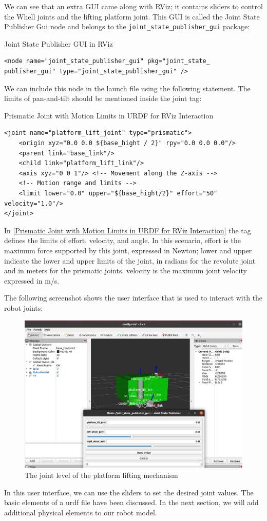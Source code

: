 \documentclass[../../main]{subfiles}
\begin{document}
We can see that an extra GUI came along with RViz; it contains sliders to control the
Whell joints and the lifting platform joint. This GUI is called the Joint State Publisher Gui node and
belongs to the \texttt{joint\_state\_publisher\_gui} package:
\begin{codebox}[]{Joint State Publisher GUI in RViz}
  \begin{verbatim}
<node name="joint_state_publisher_gui" pkg="joint_state_
publisher_gui" type="joint_state_publisher_gui" />
\end{verbatim}
  \end{codebox}

We can include this node in the launch file using the following statement. The limits of
pan-and-tilt should be mentioned inside the joint tag:

\begin{codebox}[label=Prismatic Joint with Motion Limits in URDF for RViz Interaction]{Prismatic Joint with Motion Limits in URDF for RViz Interaction}
  \begin{verbatim}
<joint name="platform_lift_joint" type="prismatic">
    <origin xyz="0.0 0.0 ${base_hight / 2}" rpy="0.0 0.0 0.0"/>
    <parent link="base_link"/>
    <child link="platform_lift_link"/>
    <axis xyz="0 0 1"/> <!-- Movement along the Z-axis -->
    <!-- Motion range and limits -->
    <limit lower="0.0" upper="${base_hight/2}" effort="50" velocity="1.0"/> 
</joint>
\end{verbatim}
\end{codebox}
\newpage

In \cref{Prismatic Joint with Motion Limits in URDF for RViz Interaction} the  tag defines the limits of effort, velocity, and angle. In this scenario,
effort is the maximum force supported by this joint, expressed in Newton; lower
and upper indicate the lower and upper limits of the joint, in radians for the revolute
joint and in meters for the prismatic joints. velocity is the maximum joint velocity
expressed in m/s.

The following screenshot shows the user interface that is used to interact with the robot
joints:
\begin{figure}[h]
    \centering
    \includegraphics[width=\textwidth]{img/roborRvz.jpg}
    \caption{The joint level of the platform lifting mechanism}
    \end{figure}


    In this user interface, we can use the sliders to set the desired joint values. The basic
    elements of a urdf file have been discussed. In the next section, we will add additional
    physical elements to our robot model.
\end{document}
